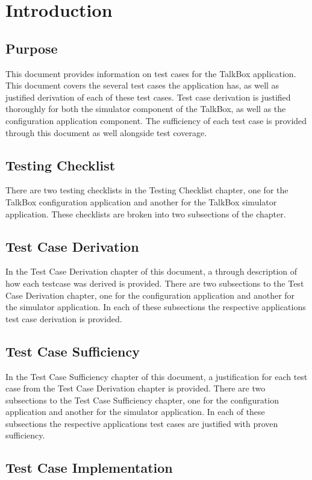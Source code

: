 \chapter{Introduction}
\label{ch:intro}
\section{Purpose}
This document provides information on test cases for the TalkBox application. This document covers the several test cases the application has, as well as justified derivation of each of these test cases. Test case derivation is justified thoroughly for both the simulator component of the TalkBox, as well as the configuration application component. The sufficiency of each test case is provided through this document as well alongside test coverage.
\section{Testing Checklist}
There are two testing checklists in the Testing Checklist chapter, one for the TalkBox configuration application and another for the TalkBox simulator application. These checklists are broken into two subsections of the chapter.
\section{Test Case Derivation}
In the Test Case Derivation chapter of this document, a through description of how each testcase was derived is provided. There are two subsections to the Test Case Derivation chapter, one for the configuration application and another for the simulator application. In each of these subsections the respective applications test case derivation is provided. 
\section{Test Case Sufficiency}
In the Test Case Sufficiency chapter of this document, a justification for each test case from the Test Case Derivation chapter is provided. There are two subsections to the Test Case Sufficiency chapter, one for the configuration application and another for the simulator application. In each of these subsections the respective applications test cases are justified with proven sufficiency.
\section{Test Case Implementation}

